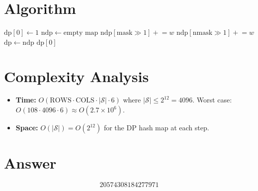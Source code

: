 \documentclass[12pt]{article}
\theoremstyle{definition}
\begin{document}
\section{Algorithm}

\begin{algorithmic}[1]
    \State $\mathrm{dp}[0] \gets 1$
            \State $\mathrm{ndp} \gets \text{empty map}$
                    \State $\mathrm{ndp}[\mathrm{mask} \gg 1] \mathrel{+}= w$
                \Else
                            \State $\mathrm{ndp}[\mathrm{nmask} \gg 1] \mathrel{+}= w$
                        \EndIf
                    \EndFor
                \EndIf
            \EndFor
            \State $\mathrm{dp} \gets \mathrm{ndp}$
        \EndFor
    \EndFor
    \State \Return $\mathrm{dp}[0]$
\EndFunction
\end{algorithmic}

\section{Complexity Analysis}
\begin{itemize}
    \item \textbf{Time:} $O(\mathrm{ROWS} \cdot \mathrm{COLS} \cdot |\mathcal{S}| \cdot 6)$ where $|\mathcal{S}| \le 2^{12} = 4096$. Worst case: $O(108 \cdot 4096 \cdot 6) \approx O(2.7 \times 10^6)$.
    \item \textbf{Space:} $O(|\mathcal{S}|) = O(2^{12})$ for the DP hash map at each step.
\end{itemize}

\section{Answer}

\[
\boxed{20574308184277971}
\]
\end{document}

